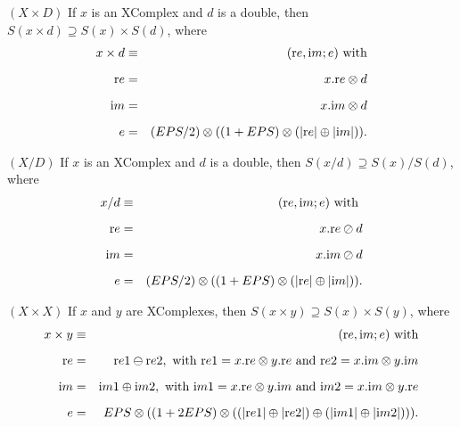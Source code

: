 \begin{proposition}\label{GMT prop7.8}{$(X  \times  D)$} 
If $x$ is an {\textrm XComplex} and $d$ is a double{\textrm ,} then 
$S(x \times d) \supseteq S(x) \times S(d)${\textrm ,} where
\begin{eqnarray*}
x \times d &\equiv& ({\mathrm re},{\mathrm im};e) \hbox{ with}\\[6pt] {\mathrm re} &= &x.{\mathrm re} \otimes d\\[6pt] {\mathrm im} &= &x.{\mathrm im} \otimes d\\[6pt] e &=& (EPS/2) \otimes ((1 + EPS) \otimes (|{\mathrm re}| \oplus |{\mathrm im}|) ). \end{eqnarray*}
\end{proposition}

\begin{proposition}\label{GMT prop7.9}{$(X / D)$} 
If $x$ is an {\textrm XComplex} and $d$ is a double{\textrm ,} then 
$S(x / d) \supseteq S(x) / S(d)${\textrm ,} where
\begin{eqnarray*}
x / d& \equiv& ({\mathrm re},{\mathrm im};e) \hbox{ with }\\[6pt] {\mathrm re}& =& x.{\mathrm re} \oslash d\\[6pt] {\mathrm im} &= &x.{\mathrm im} \oslash d\\[6pt] e& = &(EPS/2) \otimes ((1 + EPS) \otimes (|{\mathrm re}| \oplus |{\mathrm im}|) ).
\end{eqnarray*}
\end{proposition}

\begin{proposition}\label{GMT prop7.10}{$(X  \times  X)$}
If $x$ and $y$ are {\textrm XComplexes,} then 
$S(x \times y) \supseteq S(x) \times S(y)${\textrm ,} where
\begin{eqnarray*}
x \times y &\equiv& ({\mathrm re},{\mathrm im};e)\hbox{ with}\\[6pt] {\mathrm re}& =&{\mathrm  re}1 \ominus {\mathrm re2}, \hbox{ with ${\mathrm re1} = x.{\mathrm re} \otimes y.{\mathrm re}$ and ${\mathrm re}2 =
x.{\mathrm im} \otimes y.{\mathrm im}$} \\[6pt] {\mathrm im}& =& {\mathrm im}1 \oplus {\mathrm im}2, \hbox{ with ${\mathrm im}1 = x.{\mathrm re} \otimes y.{\mathrm im}$ and ${\mathrm im}2 = x.{\mathrm im} \otimes
y.{\mathrm re}$}\\[6pt] e& =& EPS \otimes ((1 + 2EPS) \otimes  ((|{\mathrm re}1| \oplus |{\mathrm re}2|) \oplus  (|{\mathrm im}1| \oplus |{\mathrm im}2|))).
\end{eqnarray*}
\end{proposition}

